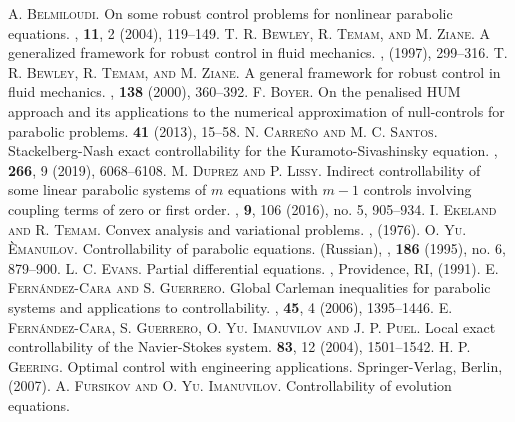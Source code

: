 \documentclass{aims}
\theoremstyle{definition}
\begin{document}
\begin{thebibliography}{99}
%
\textsc{A. Belmiloudi.}
\newblock On some robust control problems for nonlinear parabolic equations.
, \textbf{11}, 2 (2004), 119--149.
%
\textsc{T. R. Bewley, R. Temam, and M. Ziane.}
\newblock A generalized framework for robust control in fluid mechanics. 
, (1997), 299--316.
%
\textsc{T. R. Bewley, R. Temam, and M. Ziane.}
\newblock A general framework for robust control in fluid mechanics.
, \textbf{138} (2000), 360--392.
%
\textsc{F. Boyer.}
\newblock On the penalised HUM approach and its applications to the numerical approximation of null-controls for parabolic problems.
 \textbf{41} (2013), 15--58.
%
\textsc{N. Carre\~{n}o and M. C. Santos}.
\newblock Stackelberg-Nash exact controllability for the Kuramoto-Sivashinsky equation.
, \textbf{266}, 9 (2019), 6068--6108. 
%
\textsc{M. Duprez and P. Lissy.}
\newblock Indirect controllability of some linear parabolic systems of $m$ equations with $m-1$ controls involving coupling terms of zero or first order. 
, \textbf{9}, 106 (2016), no. 5, 905--934.
%
\textsc{I. Ekeland and R. Temam.}
\newblock Convex analysis and variational problems.
, (1976).
%
\textsc{O. Yu. \`{E}manuilov.} 
\newblock Controllability of parabolic equations. (Russian),
, \textbf{186} (1995), no. 6, 879--900.
%
\textsc{L. C. Evans.}
\newblock Partial differential equations. 
, Providence, RI, (1991). 
%
\textsc{E. Fern\'andez-Cara and S. Guerrero.}
\newblock Global {C}arleman inequalities for parabolic systems and applications to controllability.
, \textbf{45}, 4 (2006), 1395--1446.
%
\textsc{E. Fern\'andez-Cara, S. Guerrero, O. Yu. Imanuvilov and  J. P.  Puel.}  
\newblock Local exact controllability of the Navier-Stokes system. 
 \textbf{83}, 12 (2004),  1501--1542.
%
\textsc{H. P. Geering.}
\newblock Optimal control with engineering applications.
\newblock Springer-Verlag, Berlin, (2007). 
%
\textsc{A. Fursikov and O. Yu. Imanuvilov.}
\newblock Controllability of evolution equations.

\end{thebibliography}
\end{document}
